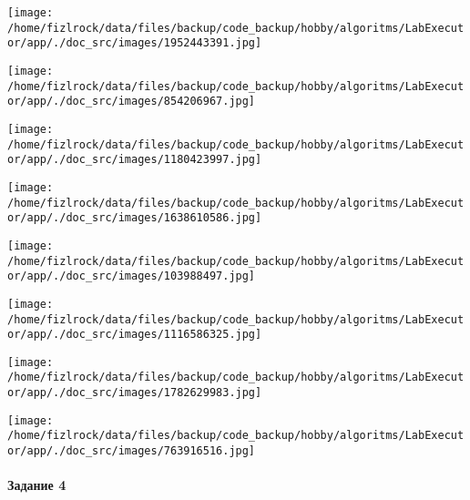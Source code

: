 \documentclass[a4paper, 12pt]{article}
\begin{document}
\texttt{[image: /home/fizlrock/data/files/backup/code\_backup/hobby/algoritms/LabExecutor/app/./doc\_src/images/1952443391.jpg]}

\texttt{[image: /home/fizlrock/data/files/backup/code\_backup/hobby/algoritms/LabExecutor/app/./doc\_src/images/854206967.jpg]}

\texttt{[image: /home/fizlrock/data/files/backup/code\_backup/hobby/algoritms/LabExecutor/app/./doc\_src/images/1180423997.jpg]}

\texttt{[image: /home/fizlrock/data/files/backup/code\_backup/hobby/algoritms/LabExecutor/app/./doc\_src/images/1638610586.jpg]}

\texttt{[image: /home/fizlrock/data/files/backup/code\_backup/hobby/algoritms/LabExecutor/app/./doc\_src/images/103988497.jpg]}

\texttt{[image: /home/fizlrock/data/files/backup/code\_backup/hobby/algoritms/LabExecutor/app/./doc\_src/images/1116586325.jpg]}

\texttt{[image: /home/fizlrock/data/files/backup/code\_backup/hobby/algoritms/LabExecutor/app/./doc\_src/images/1782629983.jpg]}

\texttt{[image: /home/fizlrock/data/files/backup/code\_backup/hobby/algoritms/LabExecutor/app/./doc\_src/images/763916516.jpg]}
\pagebreak
\paragraph{Задание 4}
\end{document}
